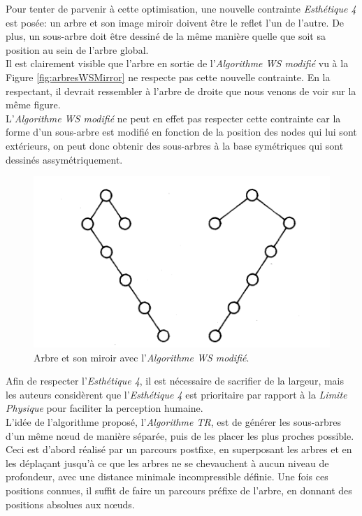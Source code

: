 \documentclass{article}
\begin{document}
  Pour tenter de parvenir à cette optimisation, une nouvelle contrainte \emph{Esthétique 4} est posée: un arbre et son image miroir doivent être le reflet l'un de l'autre. De plus, un sous-arbre doit être dessiné de la même manière quelle que soit sa position au sein de l'arbre global.\\

  Il est clairement visible que l'arbre en sortie de l'\emph{Algorithme WS modifié} vu à la Figure \ref{fig:arbresWSMirror} ne respecte pas cette nouvelle contrainte. En la respectant, il devrait ressembler à l'arbre de droite que nous venons de voir sur la même figure.\\
  
  L'\emph{Algorithme WS modifié} ne peut en effet pas respecter cette contrainte car la forme d'un sous-arbre est modifié en fonction de la position des nodes qui lui sont extérieurs, on peut donc obtenir des sous-arbres à la base symétriques qui sont dessinés assymétriquement.\\
  
  \vfill
  \begin{figure}[h]
    \begin{center}
        \includegraphics[scale=0.5]{comparArbreMiroirWS.png}
    \end{center}
    \caption{Arbre et son miroir avec l'\emph{Algorithme WS modifié}.
	\cite{article81}}
  \label{fig:arbresAlgoWS}
\end{figure}
\vfill

  Afin de respecter l'\emph{Esthétique 4}, il est nécessaire de sacrifier de la largeur, mais les auteurs considèrent que l'\emph{Esthétique 4} est prioritaire par rapport à la \emph{Limite Physique} pour faciliter la perception humaine.\\
  
  L'idée de l'algorithme proposé, l'\emph{Algorithme TR}, est de générer les sous-arbres d'un même n\oe{}ud de manière séparée, puis de les placer les plus proches possible.
  Ceci est d'abord réalisé par un parcours postfixe, en superposant les arbres et en les déplaçant jusqu'à ce que les arbres ne se chevauchent à aucun niveau de profondeur, avec une distance minimale incompressible définie. Une fois ces positions connues, il suffit de faire un parcours préfixe de l'arbre, en donnant des positions absolues aux n\oe{}uds.\\
  
\end{document}
